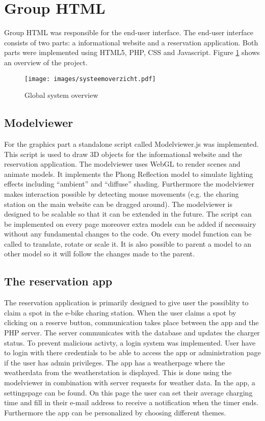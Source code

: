 \section{Group HTML}\label{HTML}

Group HTML was responsible for the end-user interface. The end-user interface consists of two parts: a informational website and a reservation application. Both parts were implemented using HTML5, PHP, CSS and Javascript. Figure \ref{img:systeemoverzicht} shows an overview of the project.

\begin{figure}[!h]
\begin{center}\texttt{[image: images/systeemoverzicht.pdf]}
\caption{Global system overview}
\label{img:systeemoverzicht}
\end{center}
\end{figure}

\subsection{Modelviewer}

For the graphics part a standalone script called Modelviewer.js was implemented. This script is used to draw 3D objects for the informational website and the reservation application. The modelviewer uses WebGL to render scenes and animate models. It implements the Phong Reflection model to simulate lighting effects including ``ambient'' and ``diffuse'' shading. Furthermore the modelviewer makes interaction possible by detecting mouse movements (e.g. the charing station on the main website can be dragged around). The modelviewer is designed to be scalable  so that it can be extended in the future. The script can be implemented on every page moreover extra models can be added if necessairy without any fundamental changes to the code. On every model function can be called to translate, rotate or scale it. It is also possible to parent a model to an other model so it will follow the changes made to the parent.

\subsection{The reservation app}

The reservation application is primarily designed to give user the possiblity to claim a spot in the e-bike charing station. When the user claims a spot by clicking on a reserve button, communication takes place between the app and the PHP server. The server communicates with the database and updates the charger status. To prevent malicious activty, a login system was implemented. User have to login with there credentials to be able to access the app or administration page if the user has admin privileges. The app has a weatherpage where the weatherdata from the weatherstation is displayed. This is done using the modelviewer in combination with server requests for weather data. In the app, a settingspage can be found. On this page the user can set their average charging time and fill in their e-mail address to receive a notification when the timer ends. Furthermore the app can be personalized by choosing different themes.

